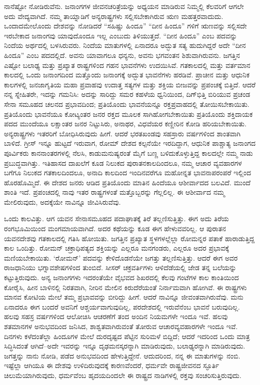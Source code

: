 ನಾನೆಷ್ಟೋ ನೋಡಿರುವೆನು. ಜನಾಂಗಗಳ ಜೀವನಚರಿತ್ರೆಯನ್ನು ಅಧ್ಯಯನ ಮಾಡಿರುವ ನಿಮ್ಮಲ್ಲಿ ಕೆಲವರಿಗೆ ಆಗಲೇ ಅದು ವೇದ್ಯವಾಗಿದೆ. ನಮ್ಮ ತಾಯ್ನಾಡಿಗೆ ಅನ್ಯರಾಷ್ಟ್ರಗಳು ಸಲ್ಲಿಸಬೇಕಾಗಿರುವ ಋಣ ಮಹತ್ತರವಾದುದು. ಒಂದಾದಮೇಲೊಂದು ದೇಶವನ್ನು ನೋಡಿದರೆ “ಸಹಿಷ್ಣು ಹಿಂದೂ” “ದೀನ ಹಿಂದೂ” ಗಳಿಗೆ ಋಣವನ್ನು ಸಲ್ಲಿಸದೇ ಇರಬೇಕಾದ ಜನಾಂಗವು ಯಾವುದೊಂದೂ ಇಲ್ಲ ಎಂಬುದು ತಿಳಿಯುತ್ತದೆ. “ದೀನ ಹಿಂದೂ” ಎಂಬ ಪದವನ್ನು ನಿಂದೆಯ ಅರ್ಥದಲ್ಲಿ ಬಳಸಿರುವರು. ನಿಂದೆಯ ಮಾತುಗಳಲ್ಲಿ ಏನಾದರೂ ಅದ್ಭುತ ಸತ್ಯ ಹುದುಗಿದ್ದರೆ ಅದೇ “ದೀನ ಹಿಂದೂ” ಎಂಬ ಪದದಲ್ಲಿದೆ. ಅವನು ಯಾವಾಗಲೂ ಧನ್ಯನು, ಅವನು ಭಗವಂತನ ಶಿಶುವಾಗಿರುವನು. ಜಗತ್ತಿನ ಎಷ್ಟೋ ಬಲಾಢ್ಯ ಮತ್ತು ಪ್ರಖ್ಯಾತ ರಾಷ್ಟ್ರಗಳಿಂದ ಗಹನ ಭಾವನೆಗಳು ಉದಯಿಸಿವೆ. ಗತಕಾಲದಲ್ಲಿ ಮತ್ತು ವರ್ತಮಾನ ಕಾಲದಲ್ಲಿ ಒಂದು ಜನಾಂಗದಿಂದ ಮತ್ತೊಂದು ಜನಾಂಗಕ್ಕೆ ಅದ್ಭುತ ಭಾವನೆಗಳು ಹರಡಿವೆ. ಪ್ರಾಚೀನ ಮತ್ತು ಆಧುನಿಕ ಕಾಲಗಳಲ್ಲಿ ಜನಜಾಗೃತಿಯ ಮಹಾ ಪ್ರವಾಹವು ಉದಾತ್ತ ಸತ್ಯಗಳ ಮತ್ತು ಶಕ್ತಿಯ ಬೀಜವನ್ನು ಪ್ರಪಂಚಕ್ಕೆ ಬಿತ್ತಿದೆ. ಆದರೆ ನನ್ನ ಸ್ನೇಹಿತರೇ, ಇದನ್ನು ಗಮನಿಸಿ: ಅದನ್ನು ಸಾರಿದ್ದು ಸಮರ ಕಹಳೆಯ ಧ್ವನಿಯಿಂದ, ದಿಗ್​ಭಿತ್ತಿ ಬಿರಿಯುವ ಪ್ರಚಂಡ ಸೇನಾ ಸಮೂಹದ ಚಲನದ ಪ್ರಭಾವದಿಂದ; ಪ್ರತಿಯೊಂದು ಭಾವನೆಯನ್ನೂ ರಕ್ತಪ್ರವಾಹದಲ್ಲಿ ತೋಯಿಸಬೇಕಾಯಿತು. ಪ್ರತಿಯೊಂದು ಭಾವನೆಯೂ ಕೋಟ್ಯಂತರ ಜನರ ರಕ್ತದ ಮೂಲಕ ಸಾಗಿಹೋಗಬೇಕಾಯಿತು ಪ್ರತಿಯೊಂದು ಶಕ್ತಿದಾಯಕ ಪದದ ಮುಂದೆಯೂ ಲಕ್ಷಾಂತರ ಜನರ ನಿಟ್ಟುಸಿರು, ಅನಾಥರ, ವಿಧವೆಯರ ಕಣ್ಣೀರಿನ ಕೋಡಿ ಹರಿಯಬೇಕಾಯಿತು. ಅನ್ಯರಾಷ್ಟ್ರಗಳು ಇತರರಿಗೆ ಬೋಧಿಸಿರುವುದು ಹೀಗೆ. ಆದರೆ ಭರತಖಂಡವು ಸಹಸ್ರಾರು ವರ್ಷಗಳಿಂದ ಶಾಂತವಾಗಿ ಬಾಳಿದೆ. ಗ್ರೀಸ್​ ಇನ್ನೂ ಹುಟ್ಟದೆ ಇರುವಾಗ, ರೋಮ್​ ದೇಶದ ಕಲ್ಪನೆಯೇ ಇರದಿದ್ದಾಗ, ಆಧುನಿಕ ಪಾಶ್ಚಾತ್ಯ ಜನಾಂಗದ ಪೂರ್ವಿಕರು ಕಾನನಾಂತರಗಳಲ್ಲಿ ನೆಲಸಿ, ಕಾಡುಮನುಷ್ಯರಂತೆ ಮೈಗೆ ಬಣ್ಣ ಬಳಿದುಕೊಳ್ಳುತ್ತಿದ್ದ ಕಾಲದಲ್ಲೇ ನಮ್ಮ ನಾಡು ಪ್ರಬುದ್ಧವಾಗಿತ್ತು. ಇತಿಹಾಸದ ದಾಖಲೆಗೆ ಕೂಡ ನಿಲುಕದ ಪುರಾತನಕಾಲದಿಂದಲೂ, ನಮ್ಮ ಆಚಾರ ವ್ಯವಹಾರಗಳ ಬಗೆಗೂ ನಿಲುಕದ ಗತಕಾಲದಿಂದಲೂ, ಅನಾದಿ ಕಾಲದಿಂದ ಇಂದಿನವರೆಗೂ ಮಹೋನ್ನತ ಭಾವನಾಪರಂಪರೆ ಇಲ್ಲಿಂದ ಹೊರಹೊಮ್ಮಿದೆ. ಈ ದೇಶದ ಜನರು ಆಡಿದ ಪ್ರತಿಯೊಂದು ಮಾತಿನ ಹಿಂದೆಯೂ ಆಶೀರ್ವಾದದ ಬಲವಿದೆ. ಮುಂದೆ ಶಾಂತಿ ಇದೆ. ಪ್ರಪಂಚದಲ್ಲಿ ನಾವು ಇತರ ರಾಷ್ಟ್ರಗಳಂತೆ ಮತ್ತೊಬ್ಬರನ್ನು ಗೆಲ್ಲಲಿಲ್ಲ. ಈ ಆಶೀರ್ವಾದ ನಮ್ಮ ಮೇಲಿರುವುದು, ಅದಕ್ಕೆಯೇ ನಾವಿನ್ನೂ ಜೀವಿಸಿರುವೆವು.

ಒಂದು ಕಾಲವಿತ್ತು. ಆಗ ಯವನ ಸೇನಾಸಮೂಹದ ಪದಾಘಾತಕ್ಕೆ ತಿರೆ ತಲ್ಲಣಿಸುತ್ತಿತ್ತು. ಈಗ ಅದು ತಿರೆಯ ರಂಗಭೂಮಿಯಿಂದ ಮಂಗಮಾಯವಾಗಿದೆ. ಅದರ ಕಥೆಯನ್ನು ಕೂಡ ಈಗ ಹೇಳುವವರಿಲ್ಲ. ಆ ಪುರಾತನ ಯವನದೇಶವು ಗತಕಾಲದಲ್ಲಿ ಗತಿಸಿ ಹೋಯಿತು. ಜಗತ್ತಿನ ಪ್ರಖ್ಯಾತ ಸ್ಥಳಗಳಲ್ಲೆಲ್ಲಾ ರೋಮನ್ನರ ಪತಾಕೆ ಹಾರಾಡುತ್ತಿದ್ದ ಕಾಲ ಒಂದಿತ್ತು. ರೋಮನ್​ ಚಕ್ರಾಧಿಪತ್ಯದ ಶಕ್ತಿಯನ್ನು ಎಲ್ಲರೂ ಮನಗಂಡರು, ಎಲ್ಲರೂ ಅದರ ಪ್ರಭಾವಕ್ಕೆ ಮಣಿಯಬೇಕಾಯಿತು. ‘ರೋಮನ್​’ ಪದವನ್ನು ಕೇಳಿದೊಡನೆಯೇ ಜಗತ್ತು ತಲ್ಲಣಿಸುತ್ತಿತ್ತು. ಆದರೆ ಈಗ ಅವರ ರಾಜಧಾನಿಯು ಭಗ್ನಾವಶೇಷಗಳಿಂದ ತುಂಬಿದೆ. ಸೀಸರ್​ ಚಕ್ರವರ್ತಿಗಳು ಆಳಿದೆಡೆಯಲ್ಲಿ ಜೇಡ ತನ್ನ ಬಲೆಯನ್ನು ಕಟ್ಟುತ್ತಿರುವುದು. ಅನ್ಯ ಜನಾಂಗಗಳು ಇದರಂತೆಯೇ ವೈಭವದ ಶಿಖರದಲ್ಲಿ ಕೆಲವು ಗಂಟೆಗಳ ಕಾಲ ಕಾಂತಿಯಿಂದ ಕೋರೈಸಿ, ಹೀನ ಬಾಳಿನಲ್ಲಿ ನಿರತವಾಗಿ, ನೀರಿನ ಮೇಲಿನ ಕಿರುದೆರೆಯಂತೆ ನಿರ್ನಾಮವಾಗಿ ಹೋಗಿವೆ. ಈ ರಾಷ್ಟ್ರಗಳು ಮಾನವ ಕೋಟಿಯ ಮೇಲೆ ತಮ್ಮ ಪ್ರಭಾವವನ್ನು ಬೀರಿದ್ದು ಹೀಗೆ. ಆದರೆ ನಾವಿನ್ನೂ ಜೀವಂತವಾಗಿರುವೆವು. ಮನು ಏನಾದರೂ ಈಗ ಬಂದರೆ ಅವನಿಗೆ ಆಶ್ಚರ್ಯವಾಗುವುದಿಲ್ಲ, ಪರದೇಶದಲ್ಲಿ ಇರುವೆನೆಂಬ ಭಾವನೆ ಬರುವುದಿಲ್ಲ. ಹಲವು ಸಹಸ್ರ ವರ್ಷಗಳಿಂದ ಆಲೋಚಿಸಿ ಆಚರಣೆಗೆ ತಂದ ಅಂದಿನ ನಿಯಮಗಳೇ ಇಂದೂ ಇವೆ. ಹಲವು ಶತಮಾನಗಳ ಅನುಭವದಿಂದ ಜನಿಸಿದ, ಶಾಶ್ವತವಾಗಿರುವಂತೆ ತೋರುವ ಆಚಾರ\break ವ್ಯವಹಾರಗಳೇ ಇಂದೂ ಇವೆ. ದಿನಗಳು ಕಳೆದಂತೆಲ್ಲಾ ಹಿಂದೂಗಳ ಮೇಲೆ ದುರದೃಷ್ಟದ ಪೆಟ್ಟಿನ ಸುರಿಮಳೆ ಬಿದ್ದಿದೆ; ಆದರೆ ಇದರಿಂದ ಒಂದು ಮಾತ್ರ ಸಿದ್ಧಿಸಿದಂತೆ ಆಗಿದೆ–ಅದೇ ಇವರನ್ನು ಇನ್ನೂ ದೃಢಮನಸ್ಕರನ್ನಾಗಿ ಮಾಡಿರುವುದು, ಬಲಾಢ್ಯರನ್ನಾಗಿ ಮಾಡಿರುವುದು. ಜಗತ್ತನ್ನು ನಾನು ನೋಡಿ, ಪಡೆದ ಅನುಭವದಿಂದ ಹೇಳುತ್ತಿದ್ದೇನೆ. ಆದುದರಿಂದ, ನನ್ನ ಈ ಮಾತುಗಳನ್ನು ನಂಬಿ. ಇಷ್ಟೆಲ್ಲಾ ಆಗಿಯೂ ಈ ದೇಶವು ಉಳಿದಿರುವುದಕ್ಕೆ ಕಾರಣವೆಂದರೆ, ಧರ್ಮವೇ ರಾಷ್ಟ್ರಜೀವನದ ಸ್ಫೂರ್ತಿ ಚಿಲುಮೆಯಾಗಿರುವುದು, ಧರ್ಮವೆಂಬ ಹೃದಯದಿಂದಲೇ ಈ ರಾಷ್ಟ್ರದ ನಾಡಿಗಳಲ್ಲಿ ರಕ್ತವು ಸಂಚರಿಸುತ್ತಿರುವುದು.

